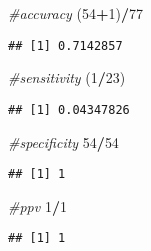 \documentclass[]{article}
\newenvironment{Shaded}{\begin{snugshade}}{\end{snugshade}}
\newcommand{\CommentTok}[1]{\textcolor[rgb]{0.56,0.35,0.01}{\textit{#1}}}
\newcommand{\ControlFlowTok}[1]{\textcolor[rgb]{0.13,0.29,0.53}{\textbf{#1}}}
\newcommand{\DataTypeTok}[1]{\textcolor[rgb]{0.13,0.29,0.53}{#1}}
\newcommand{\DecValTok}[1]{\textcolor[rgb]{0.00,0.00,0.81}{#1}}
\newcommand{\KeywordTok}[1]{\textcolor[rgb]{0.13,0.29,0.53}{\textbf{#1}}}
\newcommand{\NormalTok}[1]{#1}
\newcommand{\OperatorTok}[1]{\textcolor[rgb]{0.81,0.36,0.00}{\textbf{#1}}}
\begin{document}
\begin{Shaded}
\begin{Highlighting}[]
\CommentTok{#accuracy}
\NormalTok{(}\DecValTok{54}\OperatorTok{+}\DecValTok{1}\NormalTok{)}\OperatorTok{/}\DecValTok{77}
\end{Highlighting}
\end{Shaded}

\begin{verbatim}
## [1] 0.7142857
\end{verbatim}

\begin{Shaded}
\begin{Highlighting}[]
\CommentTok{#sensitivity}
\NormalTok{(}\DecValTok{1}\OperatorTok{/}\DecValTok{23}\NormalTok{)}
\end{Highlighting}
\end{Shaded}

\begin{verbatim}
## [1] 0.04347826
\end{verbatim}

\begin{Shaded}
\begin{Highlighting}[]
\CommentTok{#specificity}
\DecValTok{54}\OperatorTok{/}\DecValTok{54}
\end{Highlighting}
\end{Shaded}

\begin{verbatim}
## [1] 1
\end{verbatim}

\begin{Shaded}
\begin{Highlighting}[]
\CommentTok{#ppv}
\DecValTok{1}\OperatorTok{/}\DecValTok{1}
\end{Highlighting}
\end{Shaded}

\begin{verbatim}
## [1] 1
\end{verbatim}

\begin{Shaded}
\end{Shaded}
\end{document}
